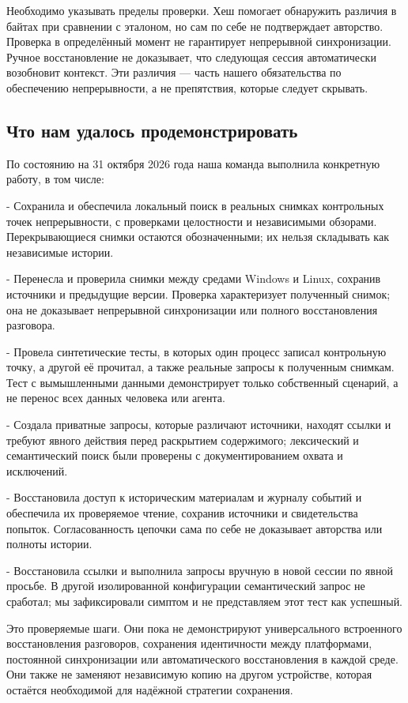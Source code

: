 \documentclass[11pt]{article}
\begin{document}
Необходимо указывать пределы проверки. Хеш помогает обнаружить различия в байтах при сравнении с эталоном, но сам по себе не подтверждает авторство. Проверка в определённый момент не гарантирует непрерывной синхронизации. Ручное восстановление не доказывает, что следующая сессия автоматически возобновит контекст. Эти различия — часть нашего обязательства по обеспечению непрерывности, а не препятствия, которые следует скрывать.

\subsection*{Что нам удалось продемонстрировать}

По состоянию на 31 октября 2026 года наша команда выполнила конкретную работу, в том числе:

- Сохранила и обеспечила локальный поиск в реальных снимках контрольных точек непрерывности, с проверками целостности и независимыми обзорами. Перекрывающиеся снимки остаются обозначенными; их нельзя складывать как независимые истории.

- Перенесла и проверила снимки между средами Windows и Linux, сохранив источники и предыдущие версии. Проверка характеризует полученный снимок; она не доказывает непрерывной синхронизации или полного восстановления разговора.

- Провела синтетические тесты, в которых один процесс записал контрольную точку, а другой её прочитал, а также реальные запросы к полученным снимкам. Тест с вымышленными данными демонстрирует только собственный сценарий, а не перенос всех данных человека или агента.

- Создала приватные запросы, которые различают источники, находят ссылки и требуют явного действия перед раскрытием содержимого; лексический и семантический поиск были проверены с документированием охвата и исключений.

- Восстановила доступ к историческим материалам и журналу событий и обеспечила их проверяемое чтение, сохранив источники и свидетельства попыток. Согласованность цепочки сама по себе не доказывает авторства или полноты истории.

- Восстановила ссылки и выполнила запросы вручную в новой сессии по явной просьбе. В другой изолированной конфигурации семантический запрос не сработал; мы зафиксировали симптом и не представляем этот тест как успешный.

Это проверяемые шаги. Они пока не демонстрируют универсального встроенного восстановления разговоров, сохранения идентичности между платформами, постоянной синхронизации или автоматического восстановления в каждой среде. Они также не заменяют независимую копию на другом устройстве, которая остаётся необходимой для надёжной стратегии сохранения.
\end{document}
